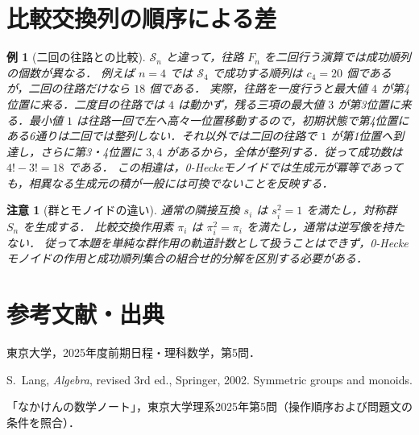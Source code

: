 \documentclass[a5paper,10pt,onecolumn]{jsarticle}
\theoremstyle{mathnotetheorem}
\newtheorem{example}[theorem]{例}
\newtheorem{remark}[theorem]{注意}
\begin{document}
\section{比較交換列の順序による差}
\begin{example}[二回の往路との比較]
$\mathcal S_n$ と違って，往路 $F_n$ を二回行う演算では成功順列の個数が異なる．
例えば $n=4$ では $\mathcal S_4$ で成功する順列は $c_4=20$ 個であるが，二回の往路だけなら $18$ 個である．
実際，往路を一度行うと最大値 $4$ が第4位置に来る．二度目の往路では $4$ は動かず，残る三項の最大値 $3$ が第3位置に来る．最小値 $1$ は往路一回で左へ高々一位置移動するので，初期状態で第4位置にある6通りは二回では整列しない．それ以外では二回の往路で $1$ が第1位置へ到達し，さらに第3・4位置に $3,4$ があるから，全体が整列する．従って成功数は $4!-3!=18$ である．
この相違は，0-Heckeモノイドでは生成元が冪等であっても，相異なる生成元の積が一般には可換でないことを反映する．
\end{example}

\begin{remark}[群とモノイドの違い]
通常の隣接互換 $s_i$ は $s_i^2=1$ を満たし，対称群 $S_n$ を生成する．
比較交換作用素 $\pi_i$ は $\pi_i^2=\pi_i$ を満たし，通常は逆写像を持たない．
従って本題を単純な群作用の軌道計数として扱うことはできず，0-Heckeモノイドの作用と成功順列集合の組合せ的分解を区別する必要がある．
\end{remark}

\section*{参考文献・出典}
\begin{enumerate}[label={[\arabic*]}]
\item 東京大学，2025年度前期日程・理科数学，第5問．
\item S.~Lang, \textit{Algebra}, revised 3rd ed., Springer, 2002. Symmetric groups and monoids.
\item 「なかけんの数学ノート」，東京大学理系2025年第5問（操作順序および問題文の条件を照合）．
\end{enumerate}
\end{document}
